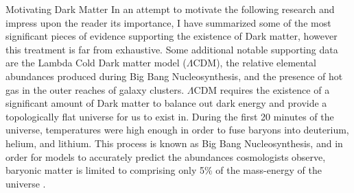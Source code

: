 \documentclass[a4paper,11pt]{article}
\begin{document}
\begin{section}{Motivating Dark Matter}
    In an attempt to motivate the following research and impress upon the reader its importance,  I have summarized some of the most significant pieces of evidence supporting the existence of Dark matter, however this treatment is far from exhaustive.
    Some additional notable supporting data are the Lambda Cold Dark matter model ($\Lambda$CDM), the relative elemental abundances produced during Big Bang Nucleosynthesis, and the presence of hot gas in the outer reaches of galaxy clusters. 
    $\Lambda$CDM requires the existence of a significant amount of Dark matter to balance out dark energy and provide a topologically flat universe for us to exist in.
    During the first 20 minutes of the universe, temperatures were high enough in order to fuse baryons into deuterium, helium, and lithium.
    This process is known as Big Bang Nucleosynthesis, and in order for models to accurately predict the abundances cosmologists observe, baryonic matter is limited to comprising only 5\% of the mass-energy of the universe \cite{Coc:2004}.
\end{section}
\end{document}
